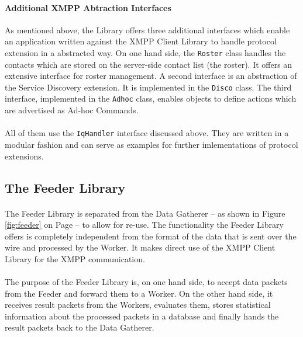 \paragraph{Additional XMPP Abtraction Interfaces}
As mentioned above, the Library offers three additional interfaces which enable an application written against the XMPP Client Library to handle protocol extension in a abstracted way. On one hand side, the \texttt{Roster} class handles the contacts which are stored on the server-side contact list (the roster). It offers an extensive interface for roster management. A second interface is an abstraction of the Service Discovery extension. It is implemented in the \texttt{Disco} class. The third interface, implemented in the \texttt{Adhoc} class, enables objects to define actions which are advertised as Ad-hoc Commands.

\paragraph{}
All of them use the \texttt{IqHandler} interface discussed above. They are written in a modular fashion and can serve as examples for further imlementations of protocol extensions.

\subsection{The Feeder Library}
\label{sec:feederlib}
\paragraph{}
The Feeder Library is separated from the Data Gatherer -- as shown in Figure \ref{fig:feeder} on Page \pageref{fig:feeder} -- to allow for re-use. The functionality the Feeder Library offers is completely independent from the format of the data that is sent over the wire and processed by the Worker. It makes direct use of the XMPP Client Library for the XMPP communication.

\paragraph{}
The purpose of the Feeder Library is, on one hand side, to accept data packets from the Feeder and forward them to a Worker. On the other hand side, it receives result packets from the Workers, evaluates them, stores statistical information about the processed packets in a database and finally hands the result packets back to the Data Gatherer.

